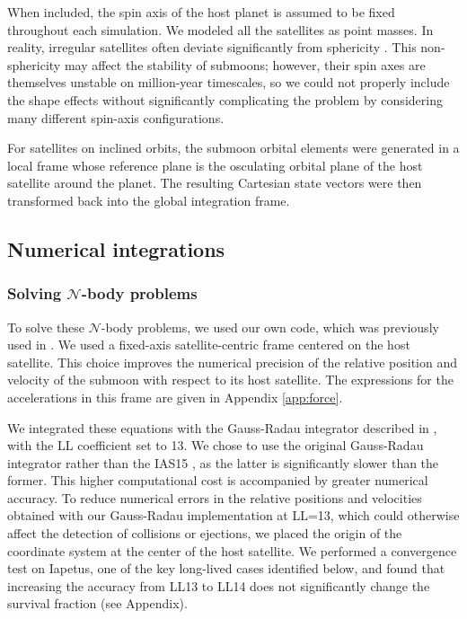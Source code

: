 \documentclass{aa}
\begin{document}
When included, the spin axis of the host planet is assumed to be fixed throughout each simulation. We modeled all the satellites as point masses. In reality, irregular satellites often deviate significantly from sphericity \citep{THOMAS_1989}. This non-sphericity may affect the stability of submoons; however, their spin axes are themselves unstable on million-year timescales, so we could not properly include the shape effects without significantly complicating the problem by considering many different spin-axis configurations.  

For satellites on inclined orbits, the submoon orbital elements were generated in a local frame whose reference plane is the osculating orbital plane of the host satellite around the planet. The resulting Cartesian state vectors were then transformed back into the global integration frame.


\subsection{Numerical integrations}
\subsubsection{Solving $\mathcal{N}$-body problems}
To solve these $\mathcal{N}$-body problems, we used our own code, which was previously used in \cite{Dahoumane_2025}. We used a fixed-axis satellite-centric frame centered on the host satellite. This choice improves the numerical precision of the relative position and velocity of the submoon with respect to its host satellite. The expressions for the accelerations in this frame are given in Appendix \ref{app:force}.

We integrated these equations with the Gauss-Radau integrator described in \cite{Everhart_1985}, with the LL coefficient set to 13. We chose to use the original Gauss-Radau integrator rather than the IAS15 \citep{REINIAS15}, as the latter is significantly slower than the former. This higher computational cost is accompanied by greater numerical accuracy. To reduce numerical errors in the relative positions and velocities obtained with our Gauss-Radau implementation at LL=13, which could otherwise affect the detection of collisions or ejections, we placed the origin of the coordinate system at the center of the host satellite. We performed a convergence test on Iapetus, one of the key long-lived cases identified below, and found that increasing the accuracy from LL13 to LL14 does not significantly change the survival fraction (see Appendix).
\end{document}
